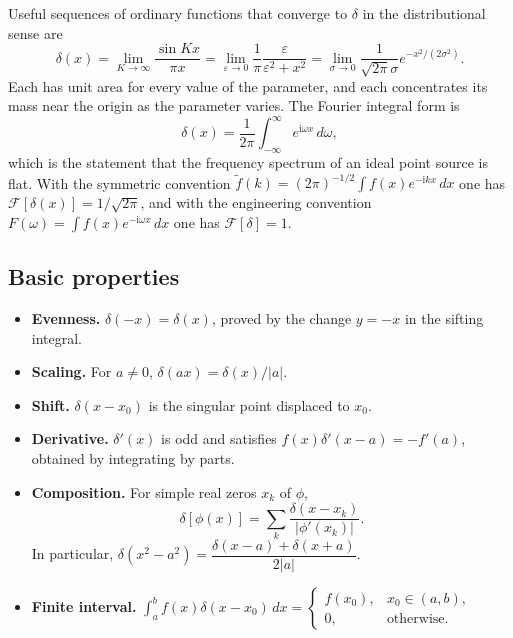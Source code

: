 Useful sequences of ordinary functions that converge to $\delta$ in the distributional sense are
\begin{equation}
\delta(x)=\lim_{K\to\infty}\frac{\sin Kx}{\pi x}
=\lim_{\varepsilon\to0}\frac{1}{\pi}\frac{\varepsilon}{\varepsilon^2+x^2}
=\lim_{\sigma\to0}\frac{1}{\sqrt{2\pi}\sigma}e^{-x^2/(2\sigma^2)}.
\end{equation}
Each has unit area for every value of the parameter, and each concentrates its mass near the origin as the parameter varies. The Fourier integral form is
\begin{equation}
\delta(x)=\frac{1}{2\pi}\int_{-\infty}^{\infty}e^{\mathrm{i}\omega x}\,d\omega,
\end{equation}
which is the statement that the frequency spectrum of an ideal point source is flat. With the symmetric convention $\widetilde f(k)=(2\pi)^{-1/2}\int f(x)e^{-\mathrm{i}kx}\,dx$ one has $\mathcal{F}[\delta(x)]=1/\sqrt{2\pi}$, and with the engineering convention $F(\omega)=\int f(x)e^{-\mathrm{i}\omega x}\,dx$ one has $\mathcal{F}[\delta]=1$.

\subsection{Basic properties}

\begin{itemize}
  \item \textbf{Evenness.} $\delta(-x)=\delta(x)$, proved by the change $y=-x$ in the sifting integral.
  \item \textbf{Scaling.} For $a\neq 0$, $\delta(ax)=\delta(x)/|a|$.
  \item \textbf{Shift.} $\delta(x-x_0)$ is the singular point displaced to $x_0$.
  \item \textbf{Derivative.} $\delta'(x)$ is odd and satisfies $f(x)\delta'(x-a)=-f'(a)$, obtained by integrating by parts.
  \item \textbf{Composition.} For simple real zeros $x_k$ of $\phi$,
  \begin{equation}
  \delta[\phi(x)]=\sum_k\frac{\delta(x-x_k)}{|\phi'(x_k)|}.
  \end{equation}
  In particular, $\delta(x^2-a^2)=\dfrac{\delta(x-a)+\delta(x+a)}{2|a|}$.
  \item \textbf{Finite interval.} $\displaystyle\int_a^b f(x)\delta(x-x_0)\,dx=
  \begin{cases}f(x_0),&x_0\in(a,b),\\ 0,&\text{otherwise.}\end{cases}$
\end{itemize}

